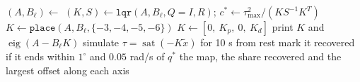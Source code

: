 \begin{algorithm}[H]
\caption{Controller design and limits (\texttt{Acrobot\_Phase3\_Design.m}, \texttt{Acrobot\_Phase3\_Main.m})}
\label{alg:p3}
\begin{algorithmic}[1]
  \State $(A,B_\ell)\gets$ 
   \State $(K,S)\gets\texttt{lqr}(A,B_\ell,Q=I,R)$; \quad $c^*\gets\tau_{\max}^2/(KS^{-1}K^T)$ 
   \State $K\gets\texttt{place}(A,B_\ell,\{-3,-4,-5,-6\})$
  \Else \State $K\gets[0,\ K_p,\ 0,\ K_d]$ 
  \EndIf
  \State print $K$ and $\operatorname{eig}(A-B_\ell K)$
\EndFor
{}
    \State simulate $\tau=\operatorname{sat}(-K\tilde x)$ for 10 s from rest 
    \State mark it recovered if it ends within $1^\circ$ and $0.05$ rad/s of $q^*$
  \EndFor
  \State \Return the map, the share recovered and the largest offset along each axis
\EndFunction
\end{algorithmic}
\end{algorithm}
